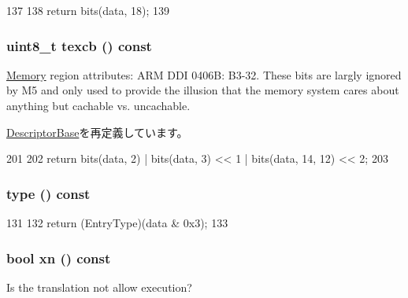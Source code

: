 \begin{DoxyCode}
137         {
138             return bits(data, 18);
139         }
\end{DoxyCode}
\hypertarget{classArmISA_1_1TableWalker_1_1L1Descriptor_a2f3e1adbe4ca1fa91c6c12f35828dd73}{
\subsubsection[{texcb}]{\setlength{\rightskip}{0pt plus 5cm}uint8\_\-t texcb () const}}
\label{classArmISA_1_1TableWalker_1_1L1Descriptor_a2f3e1adbe4ca1fa91c6c12f35828dd73}
\hyperlink{classArmISA_1_1Memory}{Memory} region attributes: ARM DDI 0406B: B3-\/32. These bits are largly ignored by M5 and only used to provide the illusion that the memory system cares about anything but cachable vs. uncachable. 

\hyperlink{classArmISA_1_1TableWalker_1_1DescriptorBase_a7d7e1ce90155279aa511dc49c2b887c2}{DescriptorBase}を再定義しています。


\begin{DoxyCode}
201         {
202             return bits(data, 2) | bits(data, 3) << 1 | bits(data, 14, 12) << 2;
203         }
\end{DoxyCode}
\hypertarget{classArmISA_1_1TableWalker_1_1L1Descriptor_afeee2b784cb2b021c06cdde9c98130d0}{
\subsubsection[{type}]{ type () const}}
\label{classArmISA_1_1TableWalker_1_1L1Descriptor_afeee2b784cb2b021c06cdde9c98130d0}



\begin{DoxyCode}
131         {
132             return (EntryType)(data & 0x3);
133         }
\end{DoxyCode}
\hypertarget{classArmISA_1_1TableWalker_1_1L1Descriptor_a88a5985b2a6224e7b546fa088b101d66}{
\subsubsection[{xn}]{\setlength{\rightskip}{0pt plus 5cm}bool xn () const}}
\label{classArmISA_1_1TableWalker_1_1L1Descriptor_a88a5985b2a6224e7b546fa088b101d66}
Is the translation not allow execution? 

